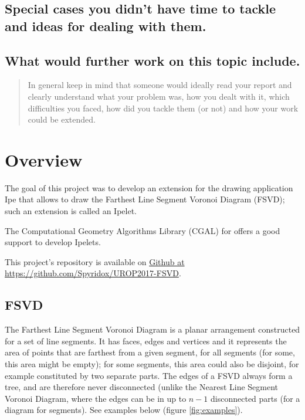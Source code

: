 \documentclass[11pt,a4paper,english]{article}
\begin{document}
    \subsection{Special cases you didn't have time to tackle and ideas for dealing with them.}
    \subsection{What would further work on this topic include.}
    
    \begin{quote}
	In general keep in mind that someone would ideally read your report and clearly understand what your problem was, how you dealt with it, which difficulties you faced, how did you tackle them (or not) and how your work could be extended.
    \end{quote}
    
    
    \newpage
    
    \section{Overview}
	
	The goal of this project was to develop an extension for the drawing application Ipe that allows to draw the Farthest Line Segment Voronoi Diagram (FSVD); such an extension is called an Ipelet.\par
	The Computational Geometry Algorithms Library (CGAL) for  offers a good support to develop Ipelets.\par
	This project's repository is available on \href{https://github.com/Spyridox/UROP2017-FSVD}{Github at https://github.com/Spyridox/UROP2017-FSVD}.
	
	\subsection{FSVD}
	
	The Farthest Line Segment Voronoi Diagram is a planar arrangement  constructed for a set of line segments. It has faces, edges and vertices and it represents the area of points that are farthest from a given segment, for all segments (for some, this area might be empty); for some segments, this area could also be disjoint, for example constituted by two separate parts. The edges of a FSVD always form a tree, and are therefore never disconnected (unlike the Nearest Line Segment Voronoi Diagram, where the edges can be in up to \(n -1\) disconnected parts (for a diagram for \n segments). See examples below (figure \ref{fig:examples}).
	
\end{document}
